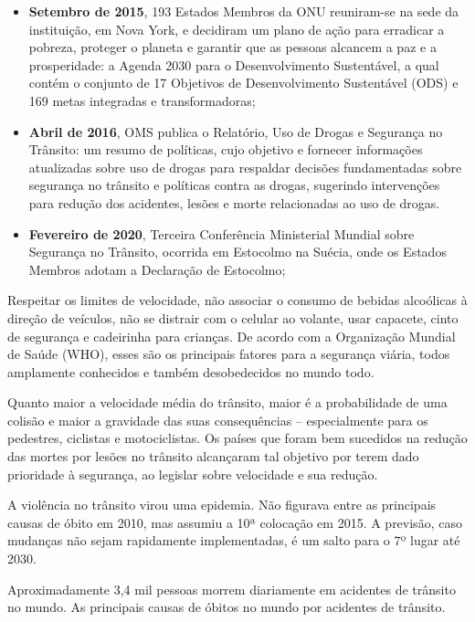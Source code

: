 \begin{itemize}
\item \textbf{Setembro de 2015}, 193 Estados Membros da ONU reuniram-se na sede da instituição, em Nova York, e decidiram um plano de ação para erradicar a pobreza, proteger o planeta e garantir que as pessoas alcancem a paz e a prosperidade: a Agenda 2030 para o Desenvolvimento Sustentável, a qual contém o conjunto de 17 Objetivos de Desenvolvimento Sustentável (ODS) e 169 metas integradas e transformadoras;
\item \textbf{Abril de 2016}, OMS publica o Relatório, Uso de Drogas e Segurança no Trânsito: um resumo de políticas, cujo objetivo e fornecer informações atualizadas sobre uso de drogas para respaldar decisões fundamentadas sobre segurança no trânsito e políticas contra as drogas, sugerindo intervenções para redução dos acidentes, lesões e morte relacionadas ao uso de drogas.
\item \textbf{Fevereiro de 2020}, Terceira Conferência Ministerial Mundial sobre Segurança no Trânsito, ocorrida em Estocolmo na Suécia, onde os Estados Membros adotam a Declaração de Estocolmo;
\end{itemize}





Respeitar os limites de velocidade, não associar o consumo de bebidas alcoólicas à direção de veículos, não se distrair com o celular ao volante, usar capacete, cinto de segurança e cadeirinha para crianças. De acordo com a Organização Mundial de Saúde (WHO), esses são os principais fatores para a segurança viária, todos amplamente conhecidos e também desobedecidos no mundo todo.\vskip0.3cm

Quanto maior a velocidade média do trânsito, maior é a probabilidade de uma colisão e maior a gravidade das suas consequências – especialmente para os pedestres, ciclistas e motociclistas. Os países que foram bem sucedidos na redução das mortes por lesões no trânsito alcançaram tal objetivo por terem dado prioridade à segurança, ao legislar sobre velocidade e sua redução.\vskip0.3cm

A violência no trânsito virou uma epidemia. Não figurava entre as principais causas de óbito em 2010, mas assumiu a 10ª colocação em 2015. A previsão, caso mudanças não sejam rapidamente implementadas, é um salto para o 7º lugar até 2030.\vskip0.3cm

Aproximadamente 3,4 mil pessoas morrem diariamente em acidentes de trânsito no mundo. As principais causas de óbitos no mundo por acidentes de trânsito.\vskip0.3cm


